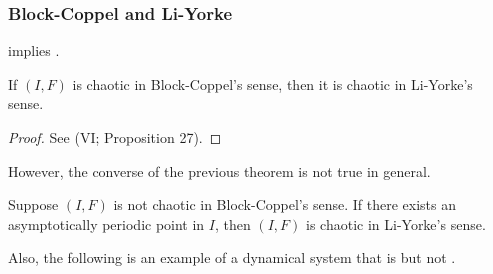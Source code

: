 \documentclass[10pt,twoside,draft]{book}
\begin{document}
\subsubsection*{Block-Coppel and Li-Yorke}
\blcp implies \liy.
\begin{theorem}
  \citep{blockcoppel}
  If $(I,F)$ is chaotic in Block-Coppel's sense, then it is chaotic in Li-Yorke's sense.
  \label{thm:blcp-liy}
  \begin{proof}
    See \citet{blockcoppel} (VI; Proposition 27).
  \end{proof}
\end{theorem}
However, the converse of the previous theorem is not true in general.
\begin{theorem}
  \citep[p.136]{blockcoppel}
  Suppose $(I,F)$ is not chaotic in Block-Coppel's sense.
  If there exists an asymptotically periodic point in $I$, then $(I,F)$ is chaotic in Li-Yorke's sense.
  \label{thm:blcp-per-liy}
\end{theorem}
Also, the following is an example of a dynamical system that is \liy but not \blcp.
\end{document}
